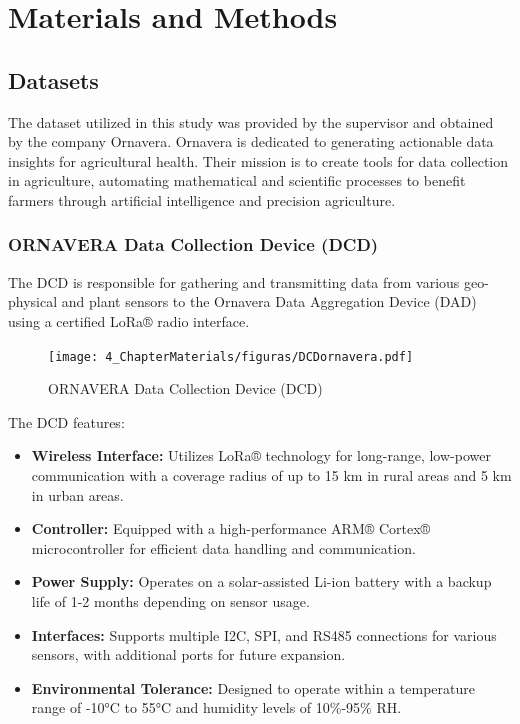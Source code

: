 \chapter{Materials and Methods}

\section{Datasets}

The dataset utilized in this study was provided by the supervisor and obtained by the company Ornavera. Ornavera is dedicated to generating actionable data insights for agricultural health. Their mission is to create tools for data collection in agriculture, automating mathematical and scientific processes to benefit farmers through artificial intelligence and precision agriculture.

\subsection{ORNAVERA Data Collection Device (DCD)}

The DCD is responsible for gathering and transmitting data from various geo-physical and plant sensors to the Ornavera Data Aggregation Device (DAD) using a certified LoRa® radio interface.
\begin{figure}[htbp]
    \centering
    \texttt{[image: 4\_ChapterMaterials/figuras/DCDornavera.pdf]}
    \caption{ORNAVERA Data Collection Device (DCD)\cite{ornavera2020dcd}}
    \end{figure}

The DCD features:
\begin{itemize}
    \item \textbf{Wireless Interface:} Utilizes LoRa® technology for long-range, low-power communication with a coverage radius of up to 15 km in rural areas and 5 km in urban areas.
    \item \textbf{Controller:} Equipped with a high-performance ARM® Cortex® microcontroller for efficient data handling and communication.
    \item \textbf{Power Supply:} Operates on a solar-assisted Li-ion battery with a backup life of 1-2 months depending on sensor usage.
    \item \textbf{Interfaces:} Supports multiple I2C, SPI, and RS485 connections for various sensors, with additional ports for future expansion.
    \item \textbf{Environmental Tolerance:} Designed to operate within a temperature range of -10°C to 55°C and humidity levels of 10\%-95\% RH.
\end{itemize}


